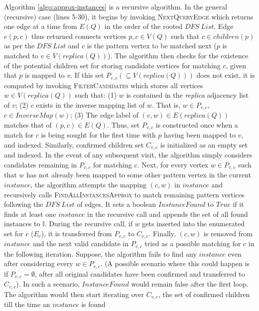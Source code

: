 Algorithm \ref{algo:approx-instances} is a recursive algorithm. In the general
(recursive) case (lines 5-30), it begins by invoking \textsc{NextQueryEdge}
which returns one edge at a time from $E(Q)$ in the order of the rooted $DFS\
List$. Edge $e(p,c)$ thus returned connects vertices $p,c \in V(Q)$ such that
$c\in children(p)$ as per the $DFS\ List$ and $c$ is the pattern vertex to be
matched next ($p$ is matched to $v \in V(replica(Q))$). The algorithm then
checks for the existence of the potential children set for storing candidate
vertices for matching $c$, given that $p$ is mapped to $v$. If this set
$P_{v,c}(\subseteq V(replica(Q)))$ does not exist, it is computed by invoking
\textsc{FilterCandidates} which stores all vertices $w\in V(replica(Q))$ such
that: (1) $w$ is contained in the \textit{replica} adjacency list of $v$; (2)
$c$ exists in the inverse mapping list of $w$. That is, \forall $w \in P_{v,c}$,
$c\in InverseMap(w)$; (3) The edge label of $(v,w)\in E(replica(Q))$ matches
that of $(p,c)\in E(Q)$. Thus, set $P_{v,c}$ is constructed once when a match
for $c$ is being sought for the first time with $p$ having been mapped to $v$,
and indexed. Similarly, confirmed children set $C_{v,c}$ is initialized as an
empty set and indexed. In the event of any subsequent visit, the algorithm
simply considers candidates remaining in $P_{v,c}$ for matching $c$. Next, for
every vertex $w \in P_{v,c}$ such that $w$ has not already been mapped to some
other pattern vertex in the current $instance$, the algorithm attempts the
mapping $(c,w)$ in $instance$ and recursively calls
\textsc{FindAllInstancesApprox} to match remaining pattern vertices following
the $DFS\ List$ of edges. It sets a boolean $InstanceFound$ to $True$ if it
finds at least one $instance$ in the recursive call and appends the set of all
found instances to $\mathbb{I}$. During the recursive call, if $w$ gets inserted
into the enumerated set for $c$ ($E_c$), it is transferred from $P_{v,c}$ to
$C_{v,c}$. Finally, $(c,w)$ is removed from $instance$ and the next valid
candidate in $P_{v,c}$ tried as a possible matching for $c$ in the following
iteration. Suppose, the algorithm fails to find any $instance$ even after
considering every $w\in P_{v,c}$. (A possible scenario where this could happen
is if $P_{v,c}=\emptyset$, after all original candidates have been confirmed and
transferred to $C_{v,c}$). In such a scenario, $InstanceFound$ would remain
false after the first loop. The algorithm would then start iterating over
$C_{v,c}$, the set of confirmed children till the time an $instance$ is found
